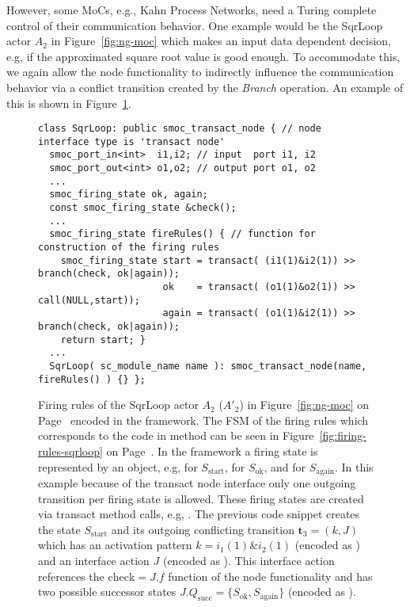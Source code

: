 However, some MoCs, e.g., Kahn Process Networks, need a Turing complete control of their
communication behavior. One example would be the SqrLoop actor $A_2$
in Figure~\ref{fig:ng-moc} which makes an input data dependent decision,
e.g, if the approximated square root value is good enough.
To accommodate this, we again allow the node functionality to indirectly
influence the communication behavior via a conflict transition
created by the \emph{Branch} operation. An example of this is shown in
Figure~\ref{systemoc-firing-rules-sqrloop}.

\begin{figure}[t]
\centering
\begin{verbatim}
class SqrLoop: public smoc_transact_node { // node interface type is 'transact node'
  smoc_port_in<int>  i1,i2; // input  port i1, i2
  smoc_port_out<int> o1,o2; // output port o1, o2
  ...
  smoc_firing_state ok, again;
  const smoc_firing_state &check();
  ...
  smoc_firing_state fireRules() { // function for construction of the firing rules
    smoc_firing_state start = transact( (i1(1)&i2(1)) >> branch(check, ok|again));
                      ok    = transact( (o1(1)&o2(1)) >> call(NULL,start));
                      again = transact( (o1(1)&i2(1)) >> branch(check, ok|again));
    return start; }
  ...
  SqrLoop( sc_module_name name ): smoc_transact_node(name, fireRules() ) {} };
\end{verbatim}
\caption{\label{systemoc-firing-rules-sqrloop}Firing rules
of the SqrLoop actor $A_2$ ($A'_2$) in Figure~\ref{fig:ng-moc} on Page~\pageref{fig:ng-moc} encoded
in the \SysteMoC{} framework. The FSM of the firing rules which corresponds to the code in
method  can be seen in
Figure~\ref{fig:firing-rules-sqrloop} on Page~\pageref{fig:firing-rules-sqrloop}.
In the \SysteMoC{} framework a firing state is represented by an
 object,
e.g,  for $S_\mathrm{start}$,
 for $S_\mathrm{ok}$, and
 for $S_\mathrm{again}$.
In this example because of the transact node interface only one outgoing transition
per firing state is allowed. These firing states are
created via transact method calls,
e.g, .
The previous code snippet creates the state $S_\mathrm{start}$ and its
outgoing conflicting transition $\mathbf{t}_3 = (k,J)$ which has an
activation pattern $k = i_1(1) \& i_2(1)$ (encoded as )
and an interface action $J$ (encoded as ).
This interface action references the $\mathrm{check} = J.f$ function of the node functionality and has
two possible successor states $J.Q_\mathrm{succ} = \{S_\mathrm{ok}, S_\mathrm{again}\}$
(encoded as ).}
\end{figure}

